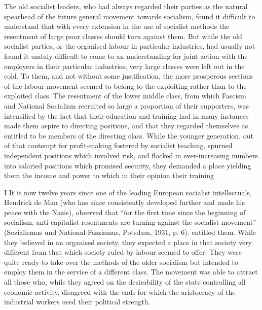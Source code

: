 \documentclass[11pt,openany]{book}
\begin{document}
\begin{center}\textasteriskcentered\hspace{0.9em}\textasteriskcentered\hspace{0.9em}\textasteriskcentered\end{center}

\begin{center}\textasteriskcentered\hspace{0.9em}\textasteriskcentered\hspace{0.9em}\textasteriskcentered\end{center}

\begin{center}\textasteriskcentered\hspace{0.9em}\textasteriskcentered\hspace{0.9em}\textasteriskcentered\end{center}

The old socialist leaders, who had always regarded their parties as the natural spearhead of the future general movement towards socialism, found it difficult to understand that with every extension in the use of socialist methods the resentment of large poor classes should turn against them. But while the old socialist parties, or the organised labour in particular industries, had usually not found it unduly difficult to come to an understanding for joint action with the employers in their particular industries, very large classes were left out in the cold. To them, and not without some justification, the more prosperous sections of the labour movement seemed to belong to the exploiting rather than to the exploited class. The resentment of the lower middle class, from which Fascism and National Socialism recruited so large a proportion of their supporters, was intensified by the fact that their education and training had in many instances made them aspire to directing positions, and that they regarded themselves as entitled to be members of the directing class. While the younger generation, out of that contempt for profit-making fostered by socialist teaching, spurned independent positions which involved risk, and flocked in ever-increasing numbers into salaried positions which promised security, they demanded a place yielding them the income and power to which in their opinion their training

I It is now twelve years since one of the leading European socialist intellectuals, Hendrick de Man (who has since consistently developed further and made his peace with the Nazis), observed that ``for the first time since the beginning of socialism, anti-capitalist resentments are turning against the socialist movement'' (Sozialismus und National-Faszismus, Potsdam, 1931, p. 6). entitled them. While they believed in an organised society, they expected a place in that society very different from that which society ruled by labour seemed to offer. They were quite ready to take over the methods of the older socialism but intended to employ them in the service of a different class. The movement was able to attract all those who, while they agreed on the desirability of the state controlling all economic activity, disagreed with the ends for which the aristocracy of the industrial workers used their political strength.
\end{document}
